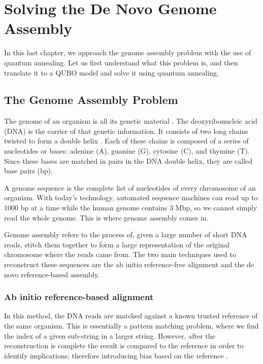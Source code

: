 \chapter{Solving the De Novo Genome Assembly}


In this last chapter, we approach the genome assembly problem with the use of quantum annealing. Let us first understand what this problem is, and then translate it to a QUBO model and solve it using quantum annealing.


\section{The Genome Assembly Problem}


The genome of an organism is all its genetic material \cite{Roth2019}. The deoxyribonucleic acid (DNA) is the carrier of that genetic information. It consists of two long chains twisted to form a double helix \cite{Alberts2007}. Each of these chains is composed of a series of nucleotides or bases: adenine (A), guanine (G), cytosine (C), and thymine (T). Since these bases are matched in pairs in the DNA double helix, they are called base pairs (bp).

A genome sequence is the complete list of nucleotides of every chromosome of an organism. With today's technology, automated sequence machines can read up to 1000 bp at a time \cite{Slatko2011} while the human genome contains 3 Mbp, so we cannot simply read the whole genome. This is where genome assembly comes in.

Genome assembly refers to the process of, given a large number of short DNA reads, stitch them together to form a large representation of the original chromosome where the reads came from. The two main techniques used to reconstruct these sequences are the ab initio reference-free alignment and the de novo reference-based assembly.


\subsection{Ab initio reference-based alignment}


In this method, the DNA reads are matched against a known trusted reference of the same organism. This is essentially a pattern matching problem, where we find the index of a given sub-string in a larger string. However, after the reconstruction is complete the result is compared to the reference in order to identify implications; therefore introducing bias based on the reference \cite{Sarkar2020}.

